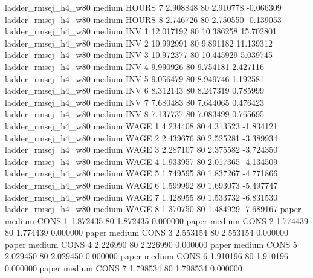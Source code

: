 ladder_rmsej_h4_w80     medium    HOURS                 7  2.908848 80       2.910778          -0.066309
ladder_rmsej_h4_w80     medium    HOURS                 8  2.746726 80       2.750550          -0.139053
ladder_rmsej_h4_w80     medium      INV                 1 12.017192 80      10.386258          15.702801
ladder_rmsej_h4_w80     medium      INV                 2 10.992991 80       9.891182          11.139312
ladder_rmsej_h4_w80     medium      INV                 3 10.972377 80      10.445929           5.039745
ladder_rmsej_h4_w80     medium      INV                 4  9.990926 80       9.754181           2.427116
ladder_rmsej_h4_w80     medium      INV                 5  9.056479 80       8.949746           1.192581
ladder_rmsej_h4_w80     medium      INV                 6  8.312143 80       8.247319           0.785999
ladder_rmsej_h4_w80     medium      INV                 7  7.680483 80       7.644065           0.476423
ladder_rmsej_h4_w80     medium      INV                 8  7.137737 80       7.083499           0.765695
ladder_rmsej_h4_w80     medium     WAGE                 1  4.234408 80       4.313523          -1.834121
ladder_rmsej_h4_w80     medium     WAGE                 2  2.439676 80       2.525281          -3.389934
ladder_rmsej_h4_w80     medium     WAGE                 3  2.287107 80       2.375582          -3.724350
ladder_rmsej_h4_w80     medium     WAGE                 4  1.933957 80       2.017365          -4.134509
ladder_rmsej_h4_w80     medium     WAGE                 5  1.749595 80       1.837267          -4.771866
ladder_rmsej_h4_w80     medium     WAGE                 6  1.599992 80       1.693073          -5.497747
ladder_rmsej_h4_w80     medium     WAGE                 7  1.428955 80       1.533732          -6.831530
ladder_rmsej_h4_w80     medium     WAGE                 8  1.370750 80       1.484929          -7.689167
              paper     medium     CONS                 1  1.872435 80       1.872435           0.000000
              paper     medium     CONS                 2  1.774439 80       1.774439           0.000000
              paper     medium     CONS                 3  2.553154 80       2.553154           0.000000
              paper     medium     CONS                 4  2.226990 80       2.226990           0.000000
              paper     medium     CONS                 5  2.029450 80       2.029450           0.000000
              paper     medium     CONS                 6  1.910196 80       1.910196           0.000000
              paper     medium     CONS                 7  1.798534 80       1.798534           0.000000
